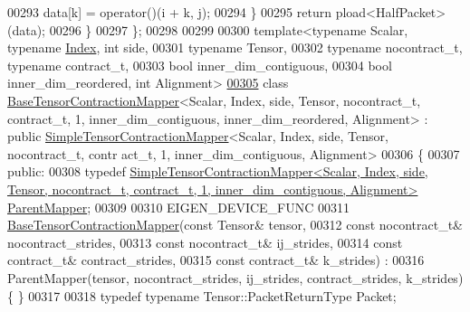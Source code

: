 \begin{DoxyCode}
00293       data[k] = operator()(i + k, j);
00294     \}
00295     \textcolor{keywordflow}{return} pload<HalfPacket>(data);
00296   \}
00297 \};
00298 
00299 
00300 \textcolor{keyword}{template}<\textcolor{keyword}{typename} Scalar, \textcolor{keyword}{typename} \hyperlink{namespace_eigen_a62e77e0933482dafde8fe197d9a2cfde}{Index}, \textcolor{keywordtype}{int} side,
00301          \textcolor{keyword}{typename} Tensor,
00302          \textcolor{keyword}{typename} nocontract\_t, \textcolor{keyword}{typename} contract\_t,
00303          \textcolor{keywordtype}{bool} inner\_dim\_contiguous,
00304          \textcolor{keywordtype}{bool} inner\_dim\_reordered, \textcolor{keywordtype}{int} Alignment>
\hyperlink{class_eigen_1_1internal_1_1_base_tensor_contraction_mapper_3_01_scalar_00_01_index_00_01side_00_080d560a1738baff9d26ac7a1ec9763b}{00305} \textcolor{keyword}{class }\hyperlink{class_eigen_1_1internal_1_1_base_tensor_contraction_mapper}{BaseTensorContractionMapper}<Scalar, Index, side, Tensor, nocontract\_t, 
      contract\_t, 1, inner\_dim\_contiguous, inner\_dim\_reordered, Alignment> : \textcolor{keyword}{public} 
      \hyperlink{class_eigen_1_1internal_1_1_simple_tensor_contraction_mapper}{SimpleTensorContractionMapper}<Scalar, Index, side, Tensor, nocontract\_t, contr
      act\_t, 1, inner\_dim\_contiguous, Alignment>
00306 \{
00307  \textcolor{keyword}{public}:
00308   \textcolor{keyword}{typedef} 
      \hyperlink{class_eigen_1_1internal_1_1_simple_tensor_contraction_mapper}{SimpleTensorContractionMapper<Scalar, Index, side, Tensor, nocontract\_t, contract\_t, 1,
       inner\_dim\_contiguous, Alignment>}
       \hyperlink{class_eigen_1_1internal_1_1_simple_tensor_contraction_mapper}{ParentMapper};
00309 
00310   EIGEN\_DEVICE\_FUNC
00311   \hyperlink{class_eigen_1_1internal_1_1_base_tensor_contraction_mapper}{BaseTensorContractionMapper}(\textcolor{keyword}{const} Tensor& tensor,
00312                               \textcolor{keyword}{const} nocontract\_t& nocontract\_strides,
00313                               \textcolor{keyword}{const} nocontract\_t& ij\_strides,
00314                               \textcolor{keyword}{const} contract\_t& contract\_strides,
00315                               \textcolor{keyword}{const} contract\_t& k\_strides) :
00316   ParentMapper(tensor, nocontract\_strides, ij\_strides, contract\_strides, k\_strides) \{ \}
00317 
00318   \textcolor{keyword}{typedef} \textcolor{keyword}{typename} Tensor::PacketReturnType Packet;

\end{DoxyCode}
